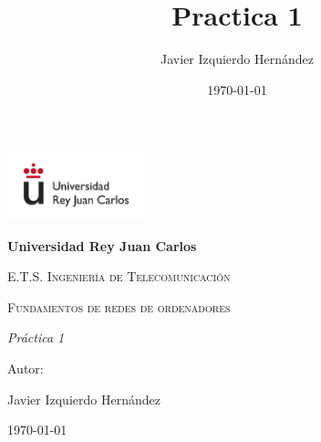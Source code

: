 \documentclass[12pt, a4paper]{report}
\title{Practica 1}
\author{Javier Izquierdo Hernández}
\date{\today}
\begin{document}
	\begin{titlepage}
		\centering
		{\includegraphics[width=0.3\textwidth]{logo}\par}
		\vspace{1cm}
		{\bfseries\LARGE Universidad Rey Juan Carlos \par}
		\vspace{1cm}
		{\scshape\Large E.T.S. Ingeniería de Telecomunicación \par}
		\vspace{3cm}
		{\scshape\Huge Fundamentos de redes de ordenadores \par}
		\vspace{3cm}
		{\itshape\Large Práctica 1 \par}
		\vfill
		{\Large Autor: \par}
		{\Large Javier Izquierdo Hernández \par}
		\vfill
		{\Large \today \par}
	\end{titlepage}

\newpage
\renewcommand{\contentsname}{Contenidos}
\tableofcontents
\newpage
\end{document}
